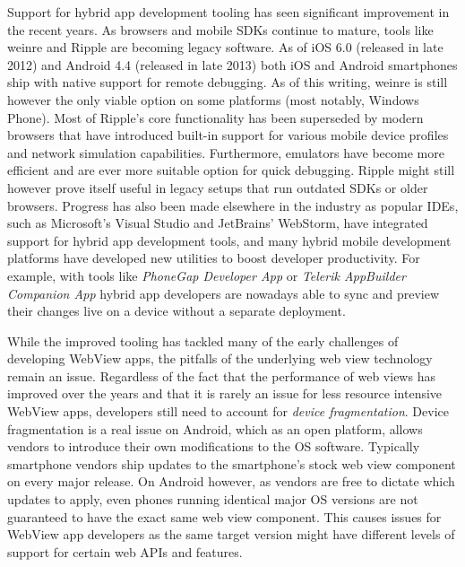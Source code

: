 \documentclass[thesis.tex]{subfiles}
\begin{document}
Support for hybrid app development tooling has seen significant improvement in the recent years. As browsers and mobile SDKs continue to mature, tools like weinre and Ripple are becoming legacy software. As of iOS 6.0 (released in late 2012) and Android 4.4 (released in late 2013) both iOS and Android smartphones ship with native support for remote debugging. As of this writing, weinre is still however the only viable option on some platforms (most notably, Windows Phone). Most of Ripple's core functionality has been superseded by modern browsers that have introduced built-in support for various mobile device profiles and network simulation capabilities. Furthermore, emulators have become more efficient and are ever more suitable option for quick debugging. Ripple might still however prove itself useful in legacy setups that run outdated SDKs or older browsers. Progress has also been made elsewhere in the industry as popular IDEs, such as Microsoft's Visual Studio and JetBrains' WebStorm, have integrated support for hybrid app development tools, and many hybrid mobile development platforms have developed new utilities to boost developer productivity. For example, with tools like \textit{PhoneGap Developer App} or \textit{Telerik AppBuilder Companion App} hybrid app developers are nowadays able to sync and preview their changes live on a device without a separate deployment.

While the improved tooling has tackled many of the early challenges of developing WebView apps, the pitfalls of the underlying web view technology remain an issue. Regardless of the fact that the performance of web views has improved over the years and that it is rarely an issue for less resource intensive WebView apps, developers still need to account for \textit{device fragmentation}. Device fragmentation is a real issue on Android, which as an open platform, allows vendors to introduce their own modifications to the OS software. Typically smartphone vendors ship updates to the smartphone's stock web view component on every major release. On Android however, as vendors are free to dictate which updates to apply, even phones running identical major OS versions are not guaranteed to have the exact same web view component. This causes issues for WebView app developers as the same target version might have different levels of support for certain web APIs and features.
\end{document}
